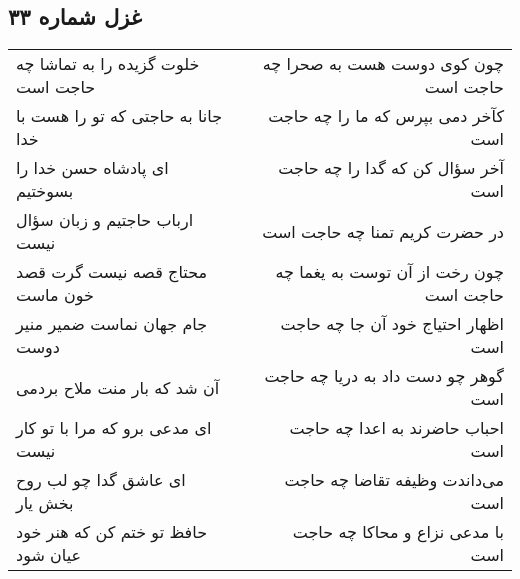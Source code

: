 \begin{center}
\section*{غزل شماره ۳۳}
\label{sec:sh033}
\begin{longtable}{l p{0.5cm} r}
خلوت گزیده را به تماشا چه حاجت است
&&
چون کوی دوست هست به صحرا چه حاجت است
\\
جانا به حاجتی که تو را هست با خدا
&&
کآخر دمی بپرس که ما را چه حاجت است
\\
ای پادشاه حسن خدا را بسوختیم
&&
آخر سؤال کن که گدا را چه حاجت است
\\
ارباب حاجتیم و زبان سؤال نیست
&&
در حضرت کریم تمنا چه حاجت است
\\
محتاج قصه نیست گرت قصد خون ماست
&&
چون رخت از آن توست به یغما چه حاجت است
\\
جام جهان نماست ضمیر منیر دوست
&&
اظهار احتیاج خود آن جا چه حاجت است
\\
آن شد که بار منت ملاح بردمی
&&
گوهر چو دست داد به دریا چه حاجت است
\\
ای مدعی برو که مرا با تو کار نیست
&&
احباب حاضرند به اعدا چه حاجت است
\\
ای عاشق گدا چو لب روح بخش یار
&&
می‌داندت وظیفه تقاضا چه حاجت است
\\
حافظ تو ختم کن که هنر خود عیان شود
&&
با مدعی نزاع و محاکا چه حاجت است
\\
\end{longtable}
\end{center}
